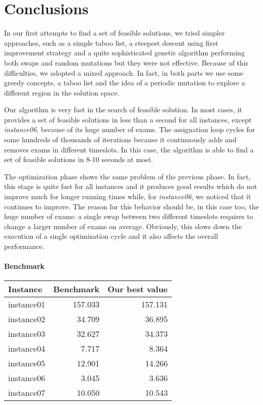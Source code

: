 \section*{Conclusions}
In our first attempts to find a set of feasible solutions, we tried simpler approaches, such as a simple taboo list, a steepest descent using first improvement strategy and a quite sophisticated genetic algorithm performing both swaps and random mutations but they were not effective. Because of this difficulties, we adopted a mixed approach. In fact, in both parts we use some greedy concepts, a taboo list and the idea of a periodic mutation to explore a different region in the solution space.

Our algorithm is very fast in the search of feasible solution. In most cases, it provides a set of feasible solutions in less than a second for all instances, except \emph{instance06}, because of its huge number of exams. The assignation loop cycles for some hundreds of thousands of iterations because it continuously adds and removes exams in different timeslots. In this case, the algorithm is able to find a set of feasible solutions in 8-10 seconds at most.

The optimization phase shows the same problem of the previous phase. In fact, this stage is quite fast for all instances and it produces good results which do not improve much for longer running times while, for \emph{instance06}, we noticed that it continues to improve. The reason for this behavior should be, in this case too, the huge number of exams: a single swap between two different timeslots requires to change a larger number of exams on average. Obviously, this slows down the execution of a single optimization cycle and it also affects the overall performance.

\paragraph*{Benchmark}
\begin{center}
\begin{tabular}{lrr}
\toprule
Instance	&	Benchmark	&	Our best value\\
\midrule
instance01	&	157.033	&	157.131	\\
instance02	&	34.709	&	36.895	\\
instance03	&	32.627	&	34.373	\\
instance04	&	7.717	&	8.364	\\
instance05	&	12.901	&	14.266	\\
instance06	&	3.045	&	3.636	\\
instance07	&	10.050	&	10.543	\\
\bottomrule
\end{tabular}
\end{center}